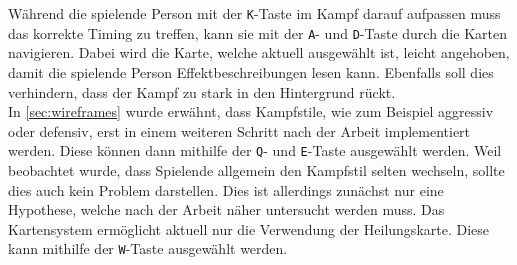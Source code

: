 Während die spielende Person mit der \texttt{K}-Taste im Kampf darauf aufpassen muss das korrekte Timing zu treffen, kann sie mit der \texttt{A}- und \texttt{D}-Taste durch die Karten navigieren.
Dabei wird die Karte, welche aktuell ausgewählt ist, leicht angehoben, damit die spielende Person Effektbeschreibungen lesen kann.
Ebenfalls soll dies verhindern, dass der Kampf zu stark in den Hintergrund rückt. \\

In \autoref{sec:wireframes} wurde erwähnt, dass Kampfstile, wie zum Beispiel aggressiv oder defensiv, erst in einem weiteren Schritt nach der Arbeit implementiert werden.
Diese können dann mithilfe der \texttt{Q}- und \texttt{E}-Taste ausgewählt werden.
Weil beobachtet wurde, dass Spielende allgemein den Kampfstil selten wechseln, sollte dies auch kein Problem darstellen.
Dies ist allerdings zunächst nur eine Hypothese, welche nach der Arbeit näher untersucht werden muss.
Das Kartensystem ermöglicht aktuell nur die Verwendung der Heilungskarte.
Diese kann mithilfe der \texttt{W}-Taste ausgewählt werden.
